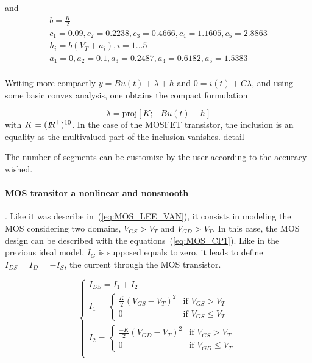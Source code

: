 \documentclass{article}
\def\leq{\leqslant}
\begin{document}
and 
\begin{equation}
  \label{eq:70}
  \begin{array}{l}
  b = \frac{K}{2} \\
  c_1 = 0.09 , c_2=0.2238 , c_3=0.4666 , c_4=1.1605 , c_5=2.8863 \\
  h_i = b(V_T+a_i), i =1\ldots 5 \\
  a_1 = 0 , a_2=0.1, a_3=0.2487 , a_4=0.6182 , a_5=1.5383 \\
\end{array}
\end{equation}


Writing more compactly $y=Bu(t)+\lambda+h$ and $0=i(t)+C\lambda$, and using some basic convex analysis, one obtains the compact formulation

\begin{equation}
\lambda=\mbox{proj}[K; -Bu(t)-h]
\end{equation}
with $K=(\mbox{\rm $I\!\!R$}^{+})^{10}$. In the case of the MOSFET transistor, the inclusion is an equality as the multivalued part of the inclusion vanishes. detail



\begin{ndrob}
  The number of segments can be customize by the user according to the accuracy wished.
\end{ndrob}

\paragraph{MOS transitor a nonlinear and nonsmooth}. Like it was describe in~(\ref{eq:MOS_LEE_VAN}),
  it consists in modeling the MOS considering two
  domains, $V_{GS} > V_T$ and $V_{GD} > V_T$. In this case, the MOS design can be described with the
  equations~(\ref{eq:MOS_CP1}). Like in the previous ideal model, $I_G$ is supposed equals to
  zero, it leads to define $I_{DS} = I_D = -I_S$, the current through the MOS transistor.

  \begin{equation}
    \label{eq:MOS_CP1}
    \left\{\begin{array}{c}
  I_{DS} = I_1 + I_2\\
  I_1 = \left\{ \begin{array}{ll}
    \frac{K}{2}(V_{GS}-V_T)^2 & \textrm{if $V_{GS}>V_T$}\\
    0 & \textrm{if $V_{GS} \leq V_T$}
\end{array} \right.\\
    
  I_2 = \left\{ \begin{array}{ll}
    \frac{-K}{2}(V_{GD}-V_T)^2& \textrm{if $V_{GS}>V_T$}\\
    0 & \textrm{if $V_{GD} \leq V_T$}
\end{array} \right.\\
      \end{array}\right.
  \end{equation}
\end{document}
